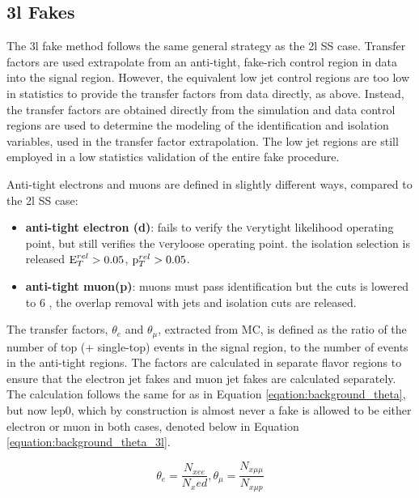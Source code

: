 



\subsection{3l Fakes}

The 3l fake method follows the same general strategy as the 2l SS case. Transfer factors are used extrapolate from an anti-tight, fake-rich control region in data into the signal region.  However, the equivalent low jet control regions are too low in statistics to provide the transfer factors from data directly, as above. Instead, the transfer factors are obtained directly from the \ttbar simulation and data control regions are used to determine the modeling of the identification and isolation variables, used in the transfer factor extrapolation. The low jet regions are still employed in a low statistics validation of the entire fake procedure. 

Anti-tight electrons and muons are defined in slightly different ways, compared to the 2l SS case:
\begin{itemize}
\item {\bf anti-tight electron (d)}: fails to verify the {\textsc verytight} likelihood operating point, but still verifies the {\textsc veryloose} operating point. the isolation selection is released $\rm E_{T}^{rel}>0.05$,  $\rm p_{T}^{rel}>0.05$.

\item {\bf anti-tight muon(p)}: muons must pass identification but the \pt cuts is lowered to 6 \gevc, the overlap removal with jets and isolation cuts are released.
\end{itemize} 
The transfer factors, $\theta_e$ and $\theta_{\mu}$, extracted from MC, is defined as the ratio of the number of top (\ttbar + single-top) events in the signal region, to the number of \ttbar events in the anti-tight regions. The factors are calculated in separate flavor regions to ensure that the electron jet fakes and muon jet fakes are calculated separately. The calculation follows the same for as in Equation \ref{eqation:background_theta}, but now lep0, which by construction is almost never a fake is allowed to be either electron or muon in both cases, denoted below in Equation \ref{equation:background_theta_3l}.  

\begin{equation}
\theta_e = \frac{N_{xee}}{N_xed}, \theta_{\mu} = \frac{N_{x\mu\mu}}{N_{x\mu p}}
\label{equation:background_theta_3l}
\end{equation}

